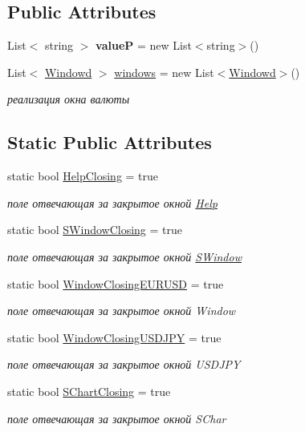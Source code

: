 \subsection*{Public Attributes}
\begin{DoxyCompactItemize}
\item 
\hypertarget{class_client_1_1_main_form_af9bb38bbfa2d759792f533061cf7d17a}{}\label{class_client_1_1_main_form_af9bb38bbfa2d759792f533061cf7d17a} 
List$<$ string $>$ {\bfseries valueP} = new List$<$string$>$()
\item 
List$<$ \hyperlink{class_client_1_1_windowd}{Windowd} $>$ \hyperlink{class_client_1_1_main_form_a3e3dca9d63d0282147f521d7f209444f}{windows} = new List$<$\hyperlink{class_client_1_1_windowd}{Windowd}$>$()
\begin{DoxyCompactList}\small\item\em реализация окна валюты \end{DoxyCompactList}\end{DoxyCompactItemize}
\subsection*{Static Public Attributes}
\begin{DoxyCompactItemize}
\item 
static bool \hyperlink{class_client_1_1_main_form_af46e70fe2775cc145de943ab8b152075}{Help\+Closing} = true
\begin{DoxyCompactList}\small\item\em поле отвечающая за закрытое окной \hyperlink{class_client_1_1_help}{Help} \end{DoxyCompactList}\item 
static bool \hyperlink{class_client_1_1_main_form_a623ae96ca11ba63ec5ecb191edf2fab0}{S\+Window\+Closing} = true
\begin{DoxyCompactList}\small\item\em поле отвечающая за закрытое окной \hyperlink{class_client_1_1_s_window}{S\+Window} \end{DoxyCompactList}\item 
static bool \hyperlink{class_client_1_1_main_form_af628f3dc899c945ef7347506f4c5612f}{Window\+Closing\+E\+U\+R\+U\+SD} = true
\begin{DoxyCompactList}\small\item\em поле отвечающая за закрытое окной Window \end{DoxyCompactList}\item 
static bool \hyperlink{class_client_1_1_main_form_a803bcf3080d58c8bcabb930e01193d09}{Window\+Closing\+U\+S\+D\+J\+PY} = true
\begin{DoxyCompactList}\small\item\em поле отвечающая за закрытое окной U\+S\+D\+J\+PY \end{DoxyCompactList}\item 
static bool \hyperlink{class_client_1_1_main_form_aa9598c4369dac295d4c45455ca7133f4}{S\+Chart\+Closing} = true
\begin{DoxyCompactList}\small\item\em поле отвечающая за закрытое окной S\+Char \end{DoxyCompactList}\end{DoxyCompactItemize}

